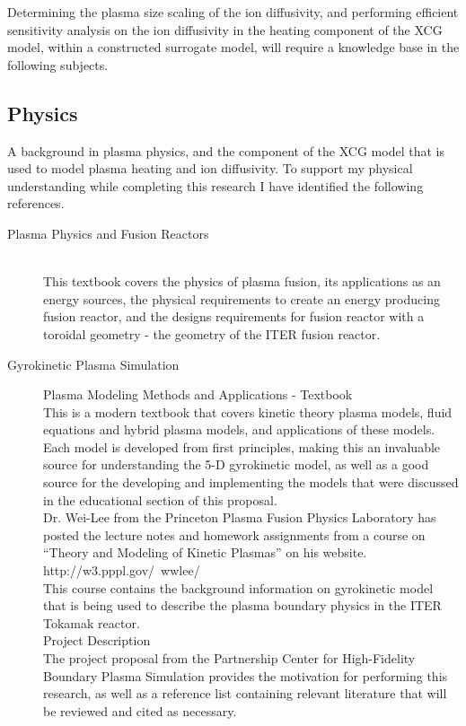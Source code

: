 \documentclass{article}
\begin{document}
Determining the plasma size scaling of the ion diffusivity, and performing efficient sensitivity analysis on the ion diffusivity in the heating component of the XCG model, within a constructed surrogate model, will require a knowledge base in the following subjects.\\  

\subsection*{Physics}

A background in plasma physics, and the component of the XCG model that is used to model plasma heating and ion diffusivity. To support my physical understanding while completing this research I have identified the following references.\\
\begin{description} %

\item[Plasma Physics and Fusion Reactors]\hfill

\\
	This textbook covers the physics of plasma fusion, its applications as an energy sources, the physical requirements to create an energy producing fusion reactor, and the designs requirements for fusion reactor with a toroidal geometry - the geometry of the ITER 		fusion reactor.\\

\item[Gyrokinetic Plasma Simulation]\hfill

	Plasma Modeling Methods and Applications - Textbook\\
	This is a modern textbook that covers kinetic theory plasma models, fluid equations and hybrid plasma models, and applications of these models.
	 Each model is developed from first principles, making this an invaluable source for understanding the 5-D 		gyrokinetic model,
 	as well as a good source for the developing and implementing the models that were discussed in the educational section of this proposal.\\
	
	Dr. Wei-Lee from the Princeton Plasma Fusion Physics Laboratory has posted the lecture notes and homework assignments from a course on “Theory and Modeling of Kinetic Plasmas” on his website.\\
	http://w3.pppl.gov/~wwlee/\\
	This course contains the background information on gyrokinetic model that is being used to describe the plasma boundary physics in the ITER Tokamak reactor. \\
	Project Description\\
	The project proposal from the Partnership Center for High-Fidelity Boundary Plasma Simulation provides the motivation for performing this research, as well as a reference list containing relevant literature that will be reviewed and cited as necessary. \\
	

\end{description}
\end{document}
